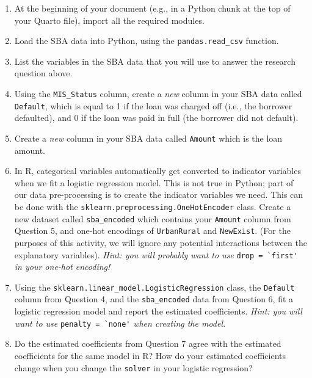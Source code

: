 \documentclass[11pt]{article}
\begin{document}
\begin{enumerate}

\item At the beginning of your document (e.g., in a Python chunk at the top of your Quarto file), import all the required modules.

\item Load the SBA data into Python, using the \verb;pandas.read_csv; function.

\item List the variables in the SBA data that you will use to answer the research question above.

\item Using the \verb;MIS_Status; column, create a \textit{new} column in your SBA data called \verb;Default;, which is equal to 1 if the loan was charged off (i.e., the borrower defaulted), and 0 if the loan was paid in full (the borrower did not default).

\item Create a \textit{new} column in your SBA data called \verb;Amount; which is the loan amount. 

\item In R, categorical variables automatically get converted to indicator variables when we fit a logistic regression model. This is not true in Python; part of our data pre-processing is to create the indicator variables we need. This can be done with the \texttt{sklearn.preprocessing.OneHotEncoder} class. Create a new dataset called \verb;sba_encoded; which contains your \verb;Amount; column from Question 5, and one-hot encodings of \texttt{UrbanRural} and \texttt{NewExist}. (For the purposes of this activity, we will ignore any potential interactions between the explanatory variables). \textit{Hint: you will probably want to use} \verb;drop = `first'; \textit{in your one-hot encoding!}

\item Using the \verb;sklearn.linear_model.LogisticRegression; class, the \verb;Default; column from Question 4, and the \verb;sba_encoded; data from Question 6, fit a logistic regression model and report the estimated coefficients. \textit{Hint: you will want to use} \verb;penalty = `none'; \textit{when creating the model.}

\item Do the estimated coefficients from Question 7 agree with the estimated coefficients for the same model in R? How do your estimated coefficients change when you change the \verb;solver; in your logistic regression?


\end{enumerate}
\end{document}
